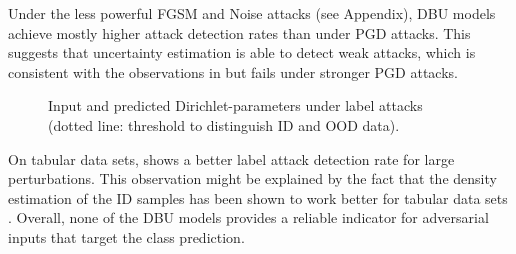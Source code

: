 Under the less powerful FGSM and Noise attacks (see Appendix), DBU models achieve mostly higher attack detection rates than under PGD attacks. This suggests that uncertainty estimation is able to detect weak attacks, which is consistent with the observations in \citep{malinin2018_adetect} but fails under stronger PGD attacks. 
%
\begin{figure}[ht]
	\centering
	\caption{Input and predicted Dirichlet-parameters under label attacks (dotted line: threshold to distinguish ID and OOD data). %
	}
	\label{fig:attaked_samples_labels}
\end{figure}


On tabular data sets, \PostNetacro{} shows a better label attack detection rate for large perturbations. This observation might be explained by the fact that the density estimation of the ID samples has been shown to work better for tabular data sets \citep{charpentier2020}. 
%
Overall, none of the DBU models provides a reliable indicator for adversarial inputs that target the class prediction. 





